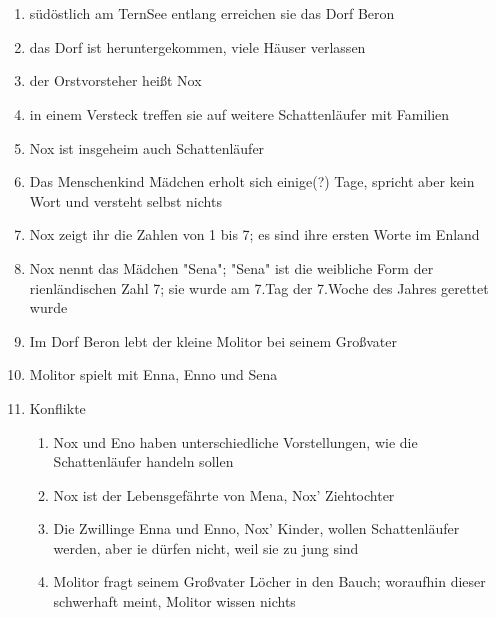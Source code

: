 \documentclass[12pt,a4paper,onecolumn,oneside,ngerman]{book}
\newcommand{\Tern}{Tern}
\newcommand{\Beron}{Beron}
\newcommand{\Molitor}{Molitor}
\newcommand{\Sena}{Sena}
\newcommand{\Enland}{Enland}
\newcommand{\Schattenlaufer}{Schattenläufer}
\newcommand{\Eno}{Eno}
\newcommand{\Nox}{Nox}
\newcommand{\Mena}{Mena}
\newcommand{\Enna}{Enna}
\newcommand{\Enno}{Enno}
\begin{document}
\chapter[Im Nest]{}
\begin{enumerate}
  \item südöstlich am {\Tern}See entlang erreichen sie das Dorf {\Beron}
  \item das Dorf ist heruntergekommen, viele Häuser verlassen
  \item der Orstvorsteher heißt {\Nox}
  \item in einem Versteck treffen sie auf weitere {\Schattenlaufer} mit Familien
  \item {\Nox} ist insgeheim auch {\Schattenlaufer}
  \item Das Menschenkind Mädchen erholt sich einige(?) Tage, spricht aber kein Wort und versteht selbst nichts
  \item {\Nox} zeigt ihr die Zahlen von 1 bis 7; es sind ihre ersten Worte im {\Enland}
  \item {\Nox} nennt das Mädchen "{\Sena}"; "{\Sena}"{ }ist die weibliche Form der rienländischen Zahl 7; sie wurde am 7.Tag der 7.Woche des Jahres gerettet wurde
  \item Im Dorf {\Beron} lebt der kleine {\Molitor} bei seinem Großvater
  \item {\Molitor} spielt mit {\Enna}, {\Enno} und {\Sena}
  \item Konflikte
  \begin{enumerate}
    \item {\Nox} und {\Eno} haben unterschiedliche Vorstellungen, wie die {\Schattenlaufer} handeln sollen
    \item {\Nox} ist der Lebensgefährte von {\Mena}, {\Nox}' Ziehtochter
    \item Die Zwillinge {\Enna} und {\Enno}, {\Nox}' Kinder, wollen {\Schattenlaufer} werden, aber ie dürfen nicht, weil sie zu jung sind
    \item {\Molitor} fragt seinem Großvater Löcher in den Bauch; woraufhin dieser schwerhaft meint, {\Molitor} wissen nichts
  \end{enumerate}
\end{enumerate}
\end{document}

